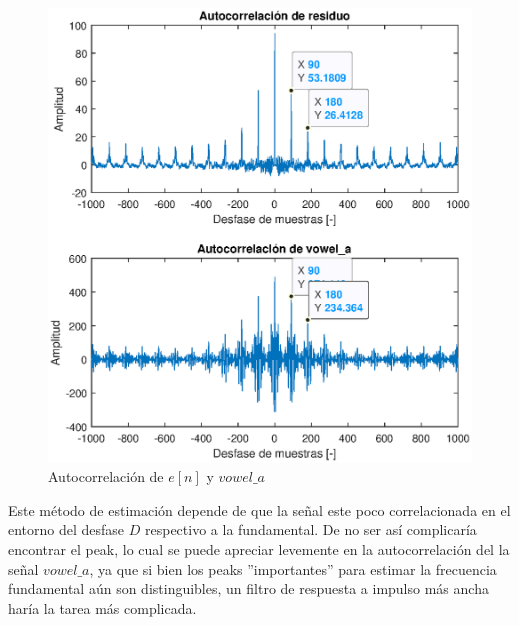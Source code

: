 \begin{figure}[H]
    \centering
    \includegraphics[width = .8\linewidth]{figures/p5_4.eps}
    \caption{Autocorrelación de $e[n]$ y $vowel\_a$}
    \label{fig:p5_4}
\end{figure}

Este método de estimación depende de que la señal este poco correlacionada en el entorno del desfase $D$ respectivo a la fundamental. De no ser así complicaría encontrar el peak, lo cual se puede apreciar levemente en la autocorrelación del la señal $vowel\_a$, ya que si bien los peaks ''importantes'' para estimar la frecuencia fundamental aún son distinguibles, un filtro de respuesta a impulso más ancha haría la tarea más complicada.
